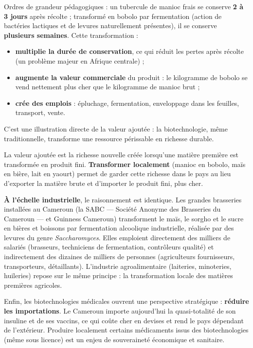 \documentclass[11pt]{article}
\newcommand{\cle}[1]{{\popxbold\color{popdark}#1}}
\begin{document}
\begin{exemplebox}
Ordres de grandeur pédagogiques : un tubercule de manioc frais se conserve \textbf{2 à 3 jours} après récolte ; transformé en bobolo par fermentation (action de bactéries lactiques et de levures naturellement présentes), il se conserve \textbf{plusieurs semaines}. Cette transformation :
\begin{itemize}
\item \textbf{multiplie la durée de conservation}, ce qui réduit les pertes après récolte (un problème majeur en Afrique centrale) ;
\item \textbf{augmente la valeur commerciale} du produit : le kilogramme de bobolo se vend nettement plus cher que le kilogramme de manioc brut ;
\item \textbf{crée des emplois} : épluchage, fermentation, enveloppage dans les feuilles, transport, vente.
\end{itemize}
C'est une illustration directe de la \cle{valeur ajoutée} : la biotechnologie, même traditionnelle, transforme une ressource périssable en richesse durable.
\end{exemplebox}

\begin{definition}
La \cle{valeur ajoutée} est la richesse nouvelle créée lorsqu'une matière première est transformée en produit fini. \textbf{Transformer localement} (manioc en bobolo, maïs en bière, lait en yaourt) permet de garder cette richesse dans le pays au lieu d'exporter la matière brute et d'importer le produit fini, plus cher.
\end{definition}

\textbf{À l'échelle industrielle}, le raisonnement est identique. Les grandes brasseries installées au Cameroun (la SABC — Société Anonyme des Brasseries du Cameroun — et Guinness Cameroun) transforment le maïs, le sorgho et le sucre en bières et boissons par fermentation alcoolique industrielle, réalisée par des levures du genre \emph{Saccharomyces}. Elles emploient directement des milliers de salariés (brasseurs, techniciens de fermentation, contrôleurs qualité) et indirectement des dizaines de milliers de personnes (agriculteurs fournisseurs, transporteurs, détaillants). L'industrie agroalimentaire (laiteries, minoteries, huileries) repose sur le même principe : la transformation locale des matières premières agricoles.

Enfin, les biotechnologies médicales ouvrent une perspective stratégique : \textbf{réduire les importations}. Le Cameroun importe aujourd'hui la quasi-totalité de son insuline et de ses vaccins, ce qui coûte cher en devises et rend le pays dépendant de l'extérieur. Produire localement certains médicaments issus des biotechnologies (même sous licence) est un enjeu de souveraineté économique et sanitaire.
\end{document}
